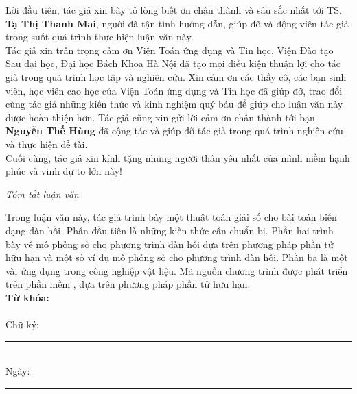 \documentclass[
12pt, %
oneside, %
english, %
onehalfspacing, %
nolistspacing, %
headsepline, %
addchap,
]{MastersDoctoralThesis} %
\begin{document}



\begin{acknowledgements}

Lời đầu tiên, tác giả xin bày tỏ lòng biết ơn chân thành và sâu sắc nhất tới TS. \textbf{Tạ Thị Thanh Mai}, người đã tận tình hướng dẫn, giúp đỡ và động viên tác giả trong suốt quá trình thực hiện luận văn này.\\[-0.5cm]

Tác giả xin trân trọng cảm ơn Viện Toán ứng dụng và Tin học, Viện Đào tạo Sau đại học, Đại học Bách Khoa Hà Nội đã tạo mọi điều kiện thuận lợi cho tác giả trong quá trình học tập và nghiên cứu. Xin cảm ơn các thầy cô, các bạn sinh viên, học viên cao học của Viện Toán ứng dụng và Tin học đã giúp đỡ, trao đổi cùng tác giả những kiến thức và kinh nghiệm quý báu để giúp cho luận văn này được hoàn thiện hơn. Tác giả cũng xin gửi lời cảm ơn chân thành tới bạn \textbf{Nguyễn Thế Hùng} đã cộng tác và giúp đỡ tác giả trong quá trình nghiên cứu và thực hiện đề tài.\\[-0.5cm]

Cuối cùng, tác giả xin kính tặng những người thân yêu nhất của mình niềm hạnh phúc và vinh dự to lớn này!\\

\begin{center}
\textit{\huge Tóm tắt luận văn}
\end{center}

Trong luận văn này, tác giả trình bày một thuật toán giải số cho bài toán biến dạng đàn hồi. Phần đầu tiên là những kiến thức cần chuẩn bị. Phần hai trình bày về mô phỏng số cho phương trình đàn hồi dựa trên phương pháp phần tử hữu hạn và một số ví dụ mô phỏng số cho phương trình đàn hồi. Phần ba là một vài ứng dụng trong công nghiệp vật liệu. Mã nguồn chương trình được phát triển trên phần mềm , dựa trên phương pháp phần tử hữu hạn.\\
\noindent \textbf{Từ khóa:} \keywordnames\\\\


\noindent Chữ ký:\\
\rule[0.5em]{20em}{0.5pt} %
\\
\noindent Ngày: \\
\rule[0.5em]{20em}{0.5pt} %
\end{acknowledgements}
\end{document}
